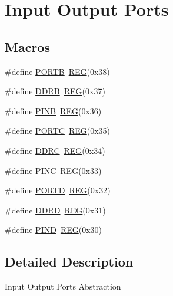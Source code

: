 \hypertarget{group__PORTS}{\section{Input Output Ports}
\label{group__PORTS}
}
\subsection*{Macros}
\begin{DoxyCompactItemize}
\item 
\#define \hyperlink{group__PORTS_ga09a0c85cd3da09d9cdf63a5ac4c39f77}{P\+O\+R\+T\+B}~\hyperlink{MCAL_8h_a72e45020e46f285689db51c46f273403}{R\+E\+G}(0x38)
\item 
\#define \hyperlink{group__PORTS_ga924a54df722121bc98383bdec5ae1898}{D\+D\+R\+B}~\hyperlink{MCAL_8h_a72e45020e46f285689db51c46f273403}{R\+E\+G}(0x37)
\item 
\#define \hyperlink{group__PORTS_ga49f0e8289e962c02128f24b94d7aea7c}{P\+I\+N\+B}~\hyperlink{MCAL_8h_a72e45020e46f285689db51c46f273403}{R\+E\+G}(0x36)
\item 
\#define \hyperlink{group__PORTS_ga68fea88642279a70246e026e7221b0a5}{P\+O\+R\+T\+C}~\hyperlink{MCAL_8h_a72e45020e46f285689db51c46f273403}{R\+E\+G}(0x35)
\item 
\#define \hyperlink{group__PORTS_ga13004c90aa4b54f1bc3fbd25ad3fd645}{D\+D\+R\+C}~\hyperlink{MCAL_8h_a72e45020e46f285689db51c46f273403}{R\+E\+G}(0x34)
\item 
\#define \hyperlink{group__PORTS_ga0545e73dc7ae14b1f62293c1feba3983}{P\+I\+N\+C}~\hyperlink{MCAL_8h_a72e45020e46f285689db51c46f273403}{R\+E\+G}(0x33)
\item 
\#define \hyperlink{group__PORTS_ga3e6a2517db4f9cb7c9037adf0aefe79b}{P\+O\+R\+T\+D}~\hyperlink{MCAL_8h_a72e45020e46f285689db51c46f273403}{R\+E\+G}(0x32)
\item 
\#define \hyperlink{group__PORTS_gae24189eeb3ce4bccd97d46e88f494e0a}{D\+D\+R\+D}~\hyperlink{MCAL_8h_a72e45020e46f285689db51c46f273403}{R\+E\+G}(0x31)
\item 
\#define \hyperlink{group__PORTS_ga50997bc44119b844ceaab463c564bfb7}{P\+I\+N\+D}~\hyperlink{MCAL_8h_a72e45020e46f285689db51c46f273403}{R\+E\+G}(0x30)
\end{DoxyCompactItemize}


\subsection{Detailed Description}
Input Output Ports Abstraction 

